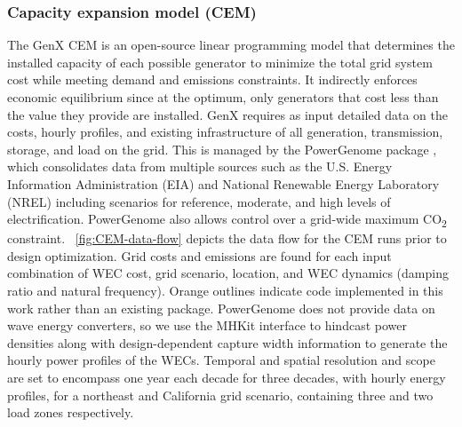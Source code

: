 \documentclass[10pt,twoside]{article}
\begin{document}
\subsubsection{Capacity expansion model (CEM)}
The GenX CEM \cite{genx} is an open-source linear programming model that determines the installed capacity of each possible generator to minimize the total grid system cost while meeting demand and emissions constraints.
It indirectly enforces economic equilibrium since at the optimum, only generators that cost less than the value they provide are installed.
GenX requires as input detailed data on the costs, hourly profiles, and existing infrastructure of all generation, transmission, storage, and load on the grid.
This is managed by the PowerGenome package \cite{schivley_powergenomepowergenome_2025}, which consolidates data from multiple sources such as the U.S. Energy Information Administration (EIA) and National Renewable Energy Laboratory (NREL) including scenarios for reference, moderate, and high levels of electrification.
PowerGenome also allows control over a grid-wide maximum CO\textsubscript{2} constraint.
\figureautorefname~\ref{fig:CEM-data-flow} depicts the data flow for the CEM runs prior to design optimization.
Grid costs and emissions are found for each input combination of WEC cost, grid scenario, location, and WEC dynamics (damping ratio and natural frequency).
Orange outlines indicate code implemented in this work rather than an existing package.
PowerGenome does not provide data on wave energy converters, so we use the MHKit interface to hindcast power densities \cite{klise_mhkit_2020} along with design-dependent capture width information to generate the hourly power profiles of the WECs. 
Temporal and spatial resolution and scope are set to encompass one year each decade for three decades, with hourly energy profiles, for a northeast and California grid scenario, containing three and two load zones respectively.
\end{document}
